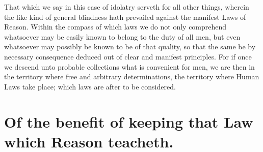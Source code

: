 That which we say in this case of idolatry serveth for all other things, wherein the like kind of general blindness hath prevailed against the manifest Laws of Reason. Within the compass of which laws we do not only comprehend whatsoever may be easily known to belong to the duty of all men, but even whatsoever may possibly be known to be of that quality, so that the same be by necessary consequence deduced out of clear and manifest principles. For if once we descend unto probable collections what is convenient for men, we are then in the territory where free and arbitrary determinations, the territory where Human Laws take place; which laws are after to be considered.

\section*{Of the benefit of keeping that Law which Reason teacheth.}

